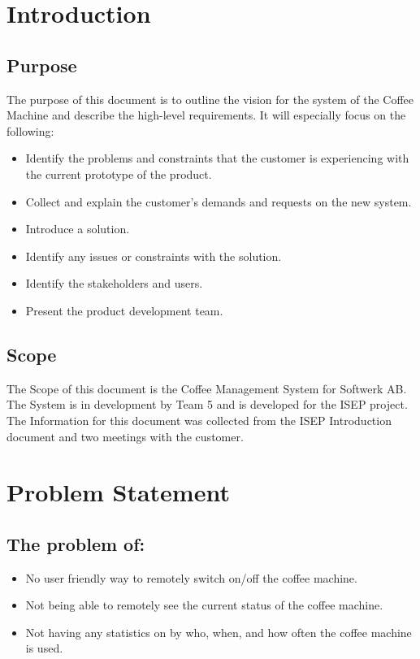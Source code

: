 \section{Introduction}

\subsection{Purpose}

The purpose of this document is to outline the vision for the system of the Coffee Machine and describe the high-level requirements. It will especially focus on the following:

\begin{itemize}

\item Identify the problems and constraints that the customer is experiencing with the current prototype of the product.
\item Collect and explain the customer’s demands and requests on the new system.
\item Introduce a solution.
\item Identify any issues or constraints with the solution.
\item Identify the stakeholders and users.
\item Present the product development team.

\end{itemize}

\subsection{Scope}

The Scope of this document is the Coffee Management System for Softwerk AB. The System is in development by Team 5 and is developed for the ISEP project. The Information for this document was collected from the ISEP Introduction document and two meetings with the customer.

\clearpage

\section{Problem Statement}

\subsection{The problem of:}

\begin{itemize}
\item No user friendly way to remotely switch on/off the coffee machine.
\item Not being able to remotely see the current status of the coffee machine.
\item Not having any statistics on by who, when, and how often the coffee machine is used.
\end{itemize}


